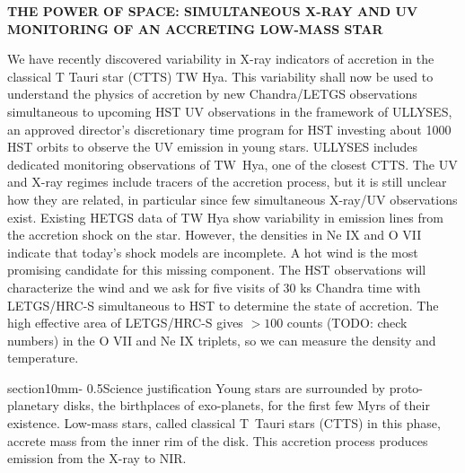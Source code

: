 \documentclass[letterpaper,11pt,twocolumn]{article}
\makeatletter
\renewcommand{\section}{\@startsection%
{section}{1}{0mm}{-\baselineskip}%
{0.5\baselineskip}{\normalfont\Large\bfseries}}%
\makeatother
\begin{document}

\pagestyle{plain}


 

\begin{center} 
\bfseries\uppercase{%
The power of space: Simultaneous X-ray and UV monitoring of an accreting
low-mass star
}
\end{center}






We have recently discovered variability in X-ray indicators of
accretion in the classical T Tauri star (CTTS) TW Hya. This
variability shall now be used to understand the physics of accretion
by new Chandra/LETGS observations simultaneous to upcoming HST UV
observations in the framework of ULLYSES, an approved director's
discretionary time program for HST investing about 1000 HST
orbits to observe the UV emission in young stars. ULLYSES
includes dedicated monitoring observations of TW~Hya, one of the closest
CTTS. The UV and X-ray regimes include tracers of the accretion
process, but it is still unclear how they are related, in particular
since few simultaneous X-ray/UV observations exist. Existing HETGS
data of TW Hya show variability in emission lines from the accretion
shock on the star. However, the densities in Ne IX and O VII indicate
that today's shock models are incomplete. A hot wind is the most
promising candidate for this missing component. The HST observations
will characterize the wind and we ask for five visits of 30 ks Chandra
time with LETGS/HRC-S simultaneous to HST to determine the state of
accretion. The high effective area of LETGS/HRC-S gives $> 100$ counts
(TODO: check numbers) in the O VII and Ne IX triplets, so we can
measure the density and temperature.


\section{Science justification}
Young stars are surrounded by proto-planetary disks, the birthplaces of exo-planets, for the first few Myrs of their existence. Low-mass stars, called classical T~Tauri stars (CTTS) in this phase, accrete mass from the inner rim of the disk. This accretion process produces emission from the X-ray to NIR.
\end{document}
